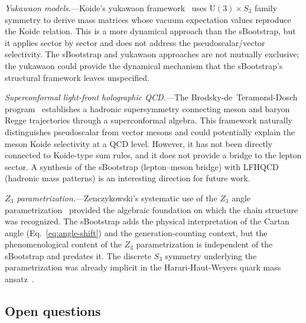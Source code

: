 \documentclass[prd,twocolumn,superscriptaddress,nofootinbib]{revtex4-2}
\begin{document}
\textit{Yukawaon models.}---Koide's yukawaon
framework~\cite{Koide2009yukawaon} uses $\text{U}(3)\times S_3$ family
symmetry to derive mass matrices whose vacuum expectation values
reproduce the Koide relation.  This is a more dynamical approach than
the sBootstrap, but it applies sector by sector and does not address the
pseudoscalar/vector selectivity.  The sBootstrap and yukawaon approaches
are not mutually exclusive; the yukawaon could provide the dynamical
mechanism that the sBootstrap's structural framework leaves unspecified.

\textit{Superconformal light-front holographic QCD.}---The
Brodsky-de~Teramond-Dosch program~\cite{Brodsky2015superconformal}
establishes a hadronic supersymmetry connecting meson and baryon Regge
trajectories through a superconformal algebra.  This framework naturally
distinguishes pseudoscalar from vector mesons and could potentially
explain the meson Koide selectivity at a QCD level.  However, it
has not been directly connected to Koide-type sum rules, and it does not
provide a bridge to the lepton sector.  A synthesis of the sBootstrap
(lepton--meson bridge) with LFHQCD (hadronic mass patterns) is an
interesting direction for future work.

\textit{$Z_3$ parametrization.}---Zenczykowski's systematic use of the
$Z_3$ angle parametrization~\cite{Zenczykowski2012,Zenczykowski2013,
Zenczykowski2018} provided the algebraic foundation on which the chain
structure was recognized.  The sBootstrap adds the physical
interpretation of the Cartan angle
(Eq.~\eqref{eq:angle-shift}) and the generation-counting context, but
the phenomenological content of the $Z_3$ parametrization is independent
of the sBootstrap and predates it.  The discrete $S_3$ symmetry
underlying the parametrization was already implicit in the
Harari-Haut-Weyers quark mass ansatz~\cite{HarariHautWeyers1978}.

\subsection{Open questions}
\end{document}
